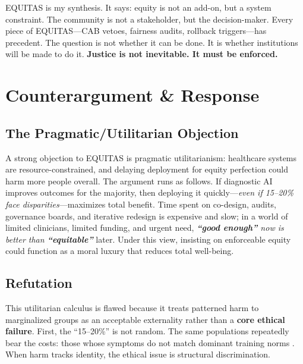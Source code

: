 \documentclass[12pt,a4paper]{article}
\begin{document}
\noindent EQUITAS is my synthesis. It says: equity is not an add-on, but a system constraint. The community is not a stakeholder, but the decision-maker. Every piece of EQUITAS—CAB vetoes, fairness audits, rollback triggers—has precedent. The question is not whether it can be done. It is whether institutions will be made to do it. \textbf{Justice is not inevitable. It must be enforced.}







\newpage
\section{Counterargument \& Response}

\subsection{The Pragmatic/Utilitarian Objection}
A strong objection to EQUITAS is pragmatic utilitarianism: healthcare systems are resource-constrained, and delaying deployment for equity perfection could harm more people overall. The argument runs as follows. If diagnostic AI improves outcomes for the majority, then deploying it quickly—\textit{even if 15--20\% face disparities}—maximizes total benefit. Time spent on co-design, audits, governance boards, and iterative redesign is expensive and slow; in a world of limited clinicians, limited funding, and urgent need, \textit{\textbf{``good enough''} now is better than \textbf{``equitable''}} later. Under this view, insisting on enforceable equity could function as a moral luxury that reduces total well-being.

\subsection{Refutation}
This utilitarian calculus is flawed because it treats patterned harm to marginalized groups as an acceptable externality rather than a \textbf{core ethical failure}. First, the ``15--20\%'' is not random. The same populations repeatedly bear the costs: those whose symptoms do not match dominant training norms \citep{Marko2025}. When harm tracks identity, the ethical issue is structural discrimination.
\end{document}

